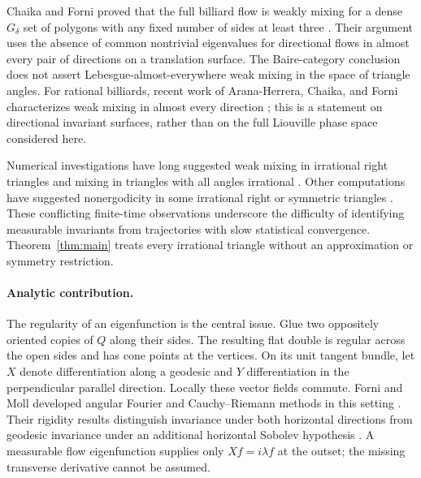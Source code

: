 Chaika and Forni proved that the full billiard flow is weakly mixing for a
dense \(G_\delta\) set of polygons with any fixed number of sides at least
three \cite{CF}. Their argument uses the absence of common nontrivial
eigenvalues for directional flows in almost every pair of directions on a
translation surface. The Baire-category conclusion does not assert
Lebesgue-almost-everywhere weak mixing in the space of triangle angles.
For rational billiards, recent work of Arana-Herrera, Chaika, and Forni
characterizes weak mixing in almost every direction \cite{ACF}; this is
a statement on directional invariant surfaces, rather than on the full
Liouville phase space considered here.

Numerical investigations have long suggested weak mixing in irrational
right triangles and mixing in triangles with all angles irrational
\cite{ACG,CP}. Other computations have suggested nonergodicity in some
irrational right or symmetric triangles \cite{WCP,ZSBJ}. These conflicting
finite-time observations underscore the difficulty of identifying
measurable invariants from trajectories with slow statistical convergence.
Theorem~\ref{thm:main} treats every irrational triangle without an
approximation or symmetry restriction.

\paragraph{Analytic contribution.}
The regularity of an eigenfunction is the central issue. Glue two oppositely
oriented copies of \(Q\) along their sides. The resulting flat double is
regular across the open sides and has cone points at the vertices. On its
unit tangent bundle, let \(X\) denote differentiation along a geodesic and
\(Y\) differentiation in the perpendicular parallel direction. Locally
these vector fields commute. Forni and Moll developed angular Fourier and
Cauchy--Riemann methods in this setting \cite[Sections~3.2--3.5]{FM}.
Their rigidity results distinguish invariance under both horizontal
directions from geodesic invariance under an additional horizontal Sobolev
hypothesis \cite[Theorem~4.1 and Corollary~4.2]{FM}.
A measurable flow eigenfunction supplies only \(Xf=i\lambda f\) at the
outset; the missing transverse derivative cannot be assumed.

